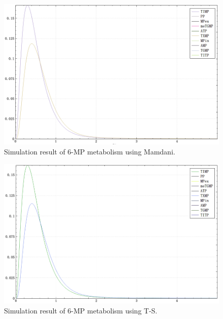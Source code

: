\documentclass[journal,a4paper,onecolumn]{article}
\begin{document}
\begin{figure}[!hbt]
	\begin{center}
		\includegraphics[width=\columnwidth]{fig55}
		\caption{Simulation result of 6-MP metabolism using Mamdani.}
		\label{fig:Simulation result of 6-MP metabolism using Mamdani.}
	\end{center}
\end{figure}

\begin{figure}[!hbt]
	\begin{center}
		\includegraphics[width=\columnwidth]{fig56}
		\caption{Simulation result of 6-MP metabolism using T-S.}
		\label{fig:Simulation result of 6-MP metabolism using T-S.}
	\end{center}
\end{figure}


\clearpage

\end{document}
